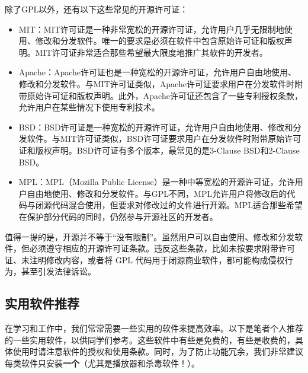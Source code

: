 除了GPL以外，还有以下这些常见的开源许可证：
\begin{itemize}
  \item MIT：MIT许可证是一种非常宽松的开源许可证，允许用户几乎无限制地使用、修改和分发软件。唯一的要求是必须在软件中包含原始许可证和版权声明。MIT许可证非常适合那些希望最大限度地推广其软件的开发者。
  \item Apache：Apache许可证也是一种宽松的开源许可证，允许用户自由地使用、修改和分发软件。与MIT许可证类似，Apache许可证要求用户在分发软件时附带原始许可证和版权声明。此外，Apache许可证还包含了一些专利授权条款，允许用户在某些情况下使用专利技术。
  \item BSD：BSD许可证是一种宽松的开源许可证，允许用户自由地使用、修改和分发软件。与MIT许可证类似，BSD许可证要求用户在分发软件时附带原始许可证和版权声明。BSD许可证有多个版本，最常见的是3-Clause BSD和2-Clause BSD。
  \item MPL：MPL（Mozilla Public License）是一种中等宽松的开源许可证，允许用户自由地使用、修改和分发软件。与GPL不同，MPL允许用户将修改后的代码与闭源代码混合使用，但要求对修改过的文件进行开源。MPL适合那些希望在保护部分代码的同时，仍然参与开源社区的开发者。
\end{itemize}

值得一提的是，开源并不等于“没有限制”。虽然用户可以自由使用、修改和分发软件，但必须遵守相应的开源许可证条款。违反这些条款，比如未按要求附带许可证、未注明修改内容，或者将 GPL 代码用于闭源商业软件，都可能构成侵权行为，甚至引发法律诉讼。


\subsection{实用软件推荐}

在学习和工作中，我们常常需要一些实用的软件来提高效率。以下是笔者个人推荐的一些实用软件，以供同学们参考。这些软件中有些是免费的，有些是收费的，具体使用时请注意软件的授权和使用条款。同时，为了防止功能冗余，我们非常建议每类软件只安装\textbf{一个}（尤其是播放器和杀毒软件！）。

